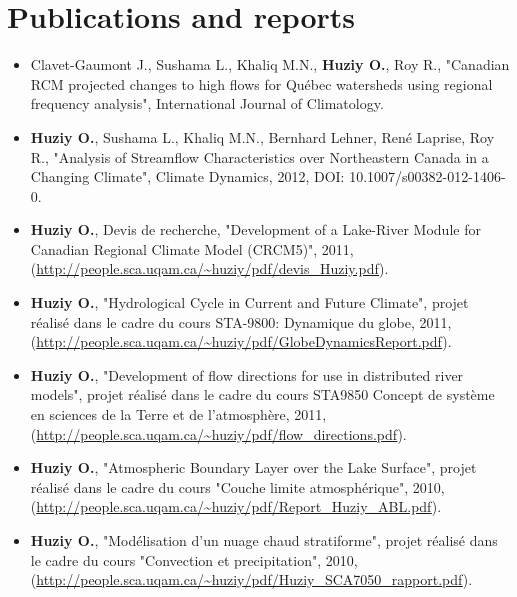 \documentclass[12pt,a4paper,sans]{moderncv}
\begin{document}
\section*{Publications and reports}
\vspace{0.5cm}
\begin{itemize}
  
    \item Clavet-Gaumont J., Sushama L., Khaliq M.N.,
    \textbf{Huziy O.}, Roy R., "Canadian RCM projected changes to high
    flows for Québec watersheds using regional frequency analysis", International Journal of Climatology.
    
    \item \textbf{Huziy O.}, Sushama L., Khaliq M.N., Bernhard
    Lehner, René Laprise, Roy R., "Analysis of Streamflow Characteristics over Northeastern Canada 
     in a Changing Climate", Climate Dynamics, 2012, DOI:
     10.1007/s00382-012-1406-0.

   
    \item \textbf{Huziy O.}, Devis de recherche, "Development of a
    Lake-River Module for Canadian Regional Climate Model (CRCM5)", 2011,
    (\url{http://people.sca.uqam.ca/~huziy/pdf/devis_Huziy.pdf}).
   
    \item \textbf{Huziy O.}, "Hydrological Cycle in Current and Future Climate",
    projet réalisé dans le cadre du cours STA-9800: Dynamique du globe, 2011,\\
     (\url{http://people.sca.uqam.ca/~huziy/pdf/GlobeDynamicsReport.pdf}).
   
    \item \textbf{Huziy O.}, "Development of flow directions for use in
    distributed river models", projet réalisé dans le cadre du cours STA9850
    Concept de système en sciences de la Terre et de l'atmosphère, 2011,
    (\url{http://people.sca.uqam.ca/~huziy/pdf/flow_directions.pdf}).
   
    \item \textbf{Huziy O.}, "Atmospheric Boundary Layer over the Lake Surface",
           projet réalisé dans le cadre du cours "Couche limite atmosphérique",
           2010, (\url{http://people.sca.uqam.ca/~huziy/pdf/Report_Huziy_ABL.pdf}).
   
    \item \textbf{Huziy O.}, "Modélisation d’un nuage chaud stratiforme",
       projet réalisé dans le cadre du cours "Convection et precipitation", 2010,
       (\url{http://people.sca.uqam.ca/~huziy/pdf/Huziy_SCA7050_rapport.pdf}).


\end{itemize}
\end{document}
